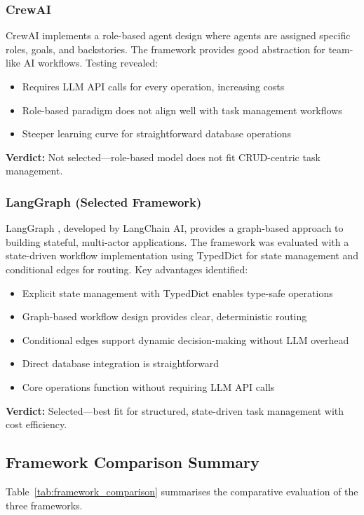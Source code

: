 \documentclass[12pt]{article}
\begin{document}
\subsubsection{CrewAI}
CrewAI implements a role-based agent design where agents are assigned specific roles, goals, and backstories. The framework provides good abstraction for team-like AI workflows. Testing revealed:
\begin{itemize}
    \item Requires LLM API calls for every operation, increasing costs
    \item Role-based paradigm does not align well with task management workflows
    \item Steeper learning curve for straightforward database operations
\end{itemize}
\textbf{Verdict:} Not selected---role-based model does not fit CRUD-centric task management.

\subsubsection{LangGraph (Selected Framework)}
LangGraph \parencite{langgraph2024}, developed by LangChain AI, provides a graph-based approach to building stateful, multi-actor applications. The framework was evaluated with a state-driven workflow implementation using TypedDict for state management and conditional edges for routing. Key advantages identified:
\begin{itemize}
    \item Explicit state management with TypedDict enables type-safe operations
    \item Graph-based workflow design provides clear, deterministic routing
    \item Conditional edges support dynamic decision-making without LLM overhead
    \item Direct database integration is straightforward
    \item Core operations function without requiring LLM API calls
\end{itemize}
\textbf{Verdict:} Selected---best fit for structured, state-driven task management with cost efficiency.

\subsection{Framework Comparison Summary}

Table~\ref{tab:framework_comparison} summarises the comparative evaluation of the three frameworks.
\end{document}

